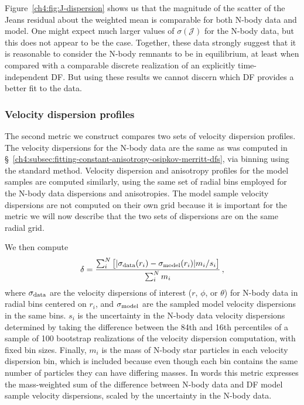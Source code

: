 Figure~\ref{ch4:fig:J-dispersion} shows us that the magnitude of the scatter of the Jeans residual about the weighted mean is comparable for both N-body data and model. One might expect much larger values of $\sigma(\mathcal{J})$ for the N-body data, but this does not appear to be the case. Together, these data strongly suggest that it is reasonable to consider the N-body remnants to be in equilibrium, at least when compared with a comparable discrete realization of an explicitly time-independent DF. But using these results we cannot discern which DF provides a better fit to the data.

\subsubsection{Velocity dispersion profiles}
\label{ch4:subsec:velocity-dispersion-profiles}

The second metric we construct compares two sets of velocity dispersion profiles. The velocity dispersions for the N-body data are the same as was computed in \S~\ref{ch4:subsec:fitting-constant-anisotropy-osipkov-merritt-dfs}, via binning using the standard method. Velocity dispersion and anisotropy profiles for the model samples are computed similarly, using the same set of radial bins employed for the N-body data dispersions and anisotropies. The model sample velocity dispersions are not computed on their own grid because it is important for the metric we will now describe that the two sets of dispersions are on the same radial grid.

We then compute
\begin{equation}
    \label{ch4:eq:velocity-dispersion-delta}
    \delta = \frac{ \sum_{i}^{N} \big[ \lvert \sigma_{\rm data}(r_{i}) - \sigma_{\rm model}(r_{i}) \rvert m_{i} / s_{i} \big] }{ \sum_{i}^{N} m_{i} }\,,
\end{equation}
\noindent where $\sigma_{\rm data}$ are the velocity dispersions of interest ($r$, $\phi$, or $\theta$) for N-body data in radial bins centered on $r_{i}$, and $\sigma_{\rm model}$ are the sampled model velocity dispersions in the same bins. $s_{i}$ is the uncertainty in the N-body data velocity dispersions determined by taking the difference between the 84th and 16th percentiles of a sample of 100 bootstrap realizations of the velocity dispersion computation, with fixed bin sizes. Finally, $m_{i}$ is the mass of N-body star particles in each velocity dispersion bin, which is included because even though each bin contains the same number of particles they can have differing masses. In words this metric expresses the mass-weighted sum of the difference between N-body data and DF model sample velocity dispersions, scaled by the uncertainty in the N-body data.

